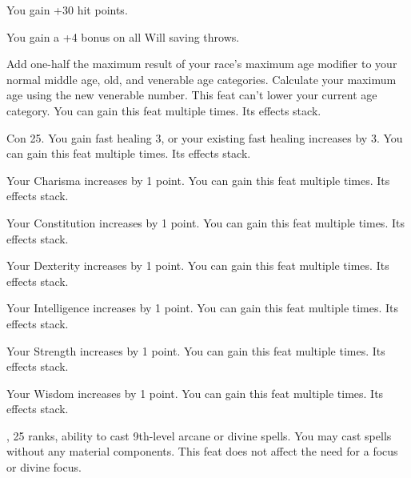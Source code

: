 {}
{You gain +30 hit points.}

{}{You gain a +4 bonus on all Will saving throws.}

{}{}
{Add one-half the maximum result of your race's maximum age modifier to your normal middle age, old, and venerable age categories. Calculate your maximum age using the new venerable number. This feat can't lower your current age category.}
{}{You can gain this feat multiple times. Its effects stack.}


{}
{Con 25.}
{You gain fast healing 3, or your existing fast healing increases by 3.}
{}{You can gain this feat multiple times. Its effects stack.}

{}{}
{Your Charisma increases by 1 point.}
{}{You can gain this feat multiple times. Its effects stack.}

{}{}
{Your Constitution increases by 1 point.}
{}{You can gain this feat multiple times. Its effects stack.}

{}{}
{Your Dexterity increases by 1 point.}
{}{You can gain this feat multiple times. Its effects stack.}

{}{}
{Your Intelligence increases by 1 point.}
{}{You can gain this feat multiple times. Its effects stack.}

{}{}
{Your Strength increases by 1 point.}
{}{You can gain this feat multiple times. Its effects stack.}

{}{}
{Your Wisdom increases by 1 point.}
{}{You can gain this feat multiple times. Its effects stack.}

{,  25 ranks, ability to cast 9th-level arcane or divine spells.}
{You may cast spells without any material components. This feat does not affect the need for a focus or divine focus.}

